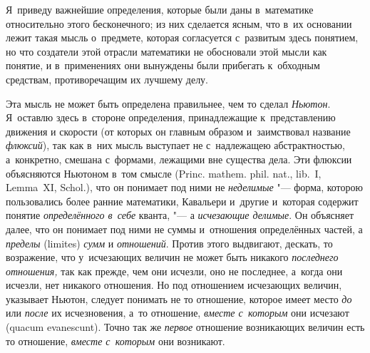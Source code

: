 Я~приведу важнейшие определения, которые были даны в~математике относительно
этого бесконечного; из них сделается ясным, что в~их основании лежит такая
мысль о~предмете, которая согласуется с~развитым здесь понятием, но что
создатели этой отрасли математики не обосновали этой мысли как понятие, и
в~применениях они вынуждены были прибегать к~обходным средствам,
противоречащим их лучшему делу.

Эта мысль не может быть определена правильнее, чем то сделал {\em Ньютон}.
Я~оставлю здесь в~стороне определения, принадлежащие к~представлению движения и
скорости (от которых он главным образом и~заимствовал название {\em флюксий}),
так как в~них мысль выступает не с~надлежащею абстрактностью, а~конкретно,
смешана с~формами, лежащими вне существа дела. Эти флюксии объясняются Ньютоном
в~том смысле (Princ. mathem. phil. nat., lib.~I, Lemma~XI, Schol.), что он
понимает под ними не {\em неделимые} "--- форма, которою пользовались более
ранние математики, Кавальери и~другие и~которая содержит понятие
{\em определённого в~себе} кванта, "--- а {\em исчезающие делимые}.
Он объясняет далее, что он понимает под ними не суммы и~отношения определённых
частей, а {\em пределы} (limites) {\em сумм} и {\em отношений}. Против этого
выдвигают, дескать, то возражение, что у~исчезающих величин не может быть
никакого {\em последнего отношения,} так как прежде, чем они исчезли, оно не
последнее, а~когда они исчезли, нет никакого отношения. Но под отношением
исчезающих величин, указывает Ньютон, следует понимать не то отношение, которое
имеет место {\em до} или {\em после} их исчезновения, а~то отношение,
{\em вместе с~которым} они исчезают (quacum evanescunt). Точно так же
{\em первое} отношение возникающих величин есть то отношение,
{\em вместе с~которым} они возникают.

